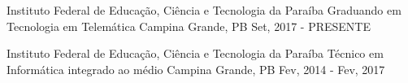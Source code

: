 
\begin{cventries}
  \cventry
    {Instituto Federal de Educação, Ciência e Tecnologia da Paraíba} %
    {Graduando em Tecnologia em Telemática} %
    {Campina Grande, PB} %
    {Set, 2017 - PRESENTE} %
    {}

  \cventry
    {Instituto Federal de Educação, Ciência e Tecnologia da Paraíba} %
    {Técnico em Informática integrado ao médio}
    {Campina Grande, PB}
    {Fev, 2014 - Fev, 2017}
    {}
\end{cventries}
